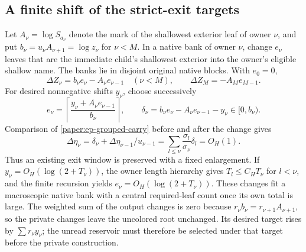 \subsection{A finite shift of the strict-exit targets}
\label{paper:ep-cascade}

Let $A_\nu=\log S_{a_\nu}$ denote the mark of the shallowest exterior
leaf of owner $\nu$, and put
$b_\nu=u_\nu A_{\nu+1}=\log z_\nu$ for $\nu<M$.
In a native bank of owner $\nu$, change $e_\nu$ leaves that are the
immediate child's shallowest exterior into the owner's eligible shallow
name. The banks lie in disjoint original native blocks. With $e_0=0$,
\[
 \Delta Z_\nu=b_\nu e_\nu-A_\nu e_{\nu-1}\quad(\nu<M),\qquad
 \Delta Z_M=-A_Me_{M-1}.
\]
For desired nonnegative shifts $y_\nu$, choose successively
\[
 e_\nu=\left\lceil\frac{y_\nu+A_\nu e_{\nu-1}}{b_\nu}\right\rceil,
 \qquad
 \delta_\nu=b_\nu e_\nu-A_\nu e_{\nu-1}-y_\nu\in[0,b_\nu).
\]
Comparison of \eqref{paper:ep-grouped-carry} before and after the change gives
\[
 \Delta\eta_\nu=\delta_\nu+\Delta\eta_{\nu-1}/u_{\nu-1}
 =\sum_{l\le\nu}\frac{\sigma_l}{\sigma_\nu}\delta_l=O_H(1).
\]
Thus an existing exit window is preserved with a fixed enlargement.
If $y_\nu=O_H(\log(2+T_\nu))$, the owner length hierarchy gives
$T_l\le C_HT_\nu$ for $l<\nu$, and the finite recursion yields
$e_\nu=O_H(\log(2+T_\nu))$. These changes fit a macroscopic native
bank with a central required-leaf count once its own total is large.
The weighted sum of the output changes is zero because
$r_\nu b_\nu=r_{\nu+1}A_{\nu+1}$, so the private changes leave the
uncolored root unchanged. Its desired target rises by
$\sum r_\nu y_\nu$; the unread reservoir must therefore be selected
under that target before the private construction.
